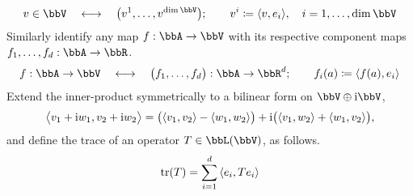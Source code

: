 \begin{equation*}
  \vecVar \in \vecSpace \quad\longleftrightarrow\quad \big(\vecVar^1, \ldots, \vecVar^{\operatorname{dim}\vecSpace}\big); \qquad \vecVar^i \defeq \prj{\vecVar}{\basisVec_i}, \quad i = 1, \ldots, \operatorname{dim}\vecSpace
\end{equation*}
Similarly identify any map $f: \bbA \rightarrow \vecSpace$ with its respective component maps $f_1, \ldots, f_d: \bbA \rightarrow \bbR$.
\begin{equation*}
  f: \bbA \rightarrow \vecSpace \quad\longleftrightarrow\quad \big(f_1,\ldots, f_d\big): \bbA \rightarrow \bbR^d; \qquad f_i(a) \defeq \prj{f(a)}{\basisVec_i}
\end{equation*}
Extend the inner-product symmetrically to a bilinear form on $\vecSpace\oplus\im\vecSpace$,
\begin{equation*}
  {\big\langle v_1+{\rm i}w_1 , v_2 + {\rm i}w_2 \big\rangle} = \big({\langle v_1 , v_2 \rangle} - {\langle w_1 , w_2 \rangle}\big) + {\rm i}\big({\langle v_1 , w_2 \rangle} + {\langle w_1 , v_2 \rangle}\big),
\end{equation*}
and define the trace of an operator $T \in \bbL(\vecSpace)$, as follows.
\begin{equation*}
  \operatorname{tr}(T) = \sum_{i=1}^d {\langle e_i , Te_i \rangle}
\end{equation*}

